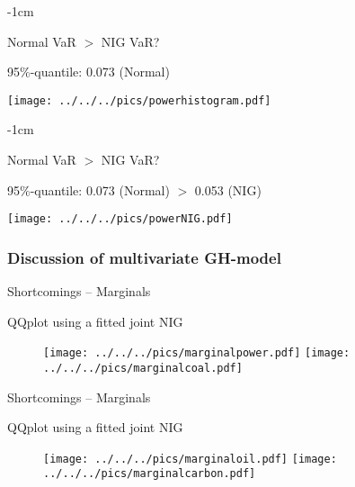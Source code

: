 {-1cm}
\begin{center}
Normal VaR $>$ NIG VaR?
\end{center}
95\%-quantile: \hspace{1cm} 0.073 (Normal) \hspace{1cm} \\
\begin{center}
\texttt{[image: ../../../pics/powerhistogram.pdf]}
\end{center}

{-1cm}
\begin{center}
Normal VaR $>$ NIG VaR?
\end{center}
95\%-quantile: \hspace{1cm} 0.073 (Normal) \hspace{1cm}$>$ \hspace{1cm} 0.053 (NIG) \\
\begin{center}
\texttt{[image: ../../../pics/powerNIG.pdf]}
\end{center}

 \subsubsection{Discussion of multivariate GH-model}

{Shortcomings -- Marginals} %
\begin{center}
QQplot using a fitted joint NIG
\begin{figure}
\begin{center}
\texttt{[image: ../../../pics/marginalpower.pdf]}
\texttt{[image: ../../../pics/marginalcoal.pdf]}
\end{center}
\end{figure}
\end{center}

{Shortcomings -- Marginals} %
\begin{center}
QQplot using a fitted joint NIG
\begin{figure}
\begin{center}
\texttt{[image: ../../../pics/marginaloil.pdf]}
\texttt{[image: ../../../pics/marginalcarbon.pdf]}
\end{center}
\end{figure}
\end{center}

